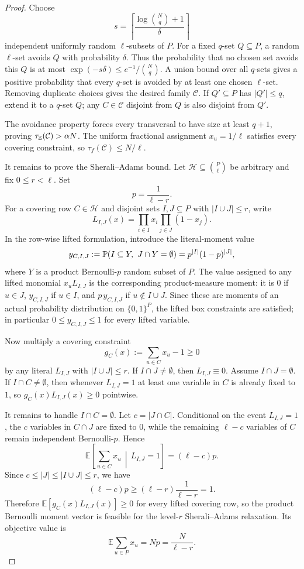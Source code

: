 \begin{proof}
Choose
\[
  s=\left\lceil\frac{\log\binom Nq+1}{\delta}\right\rceil
\]
independent uniformly random $\ell$-subsets of $P$.  For a fixed $q$-set
$Q\subseteq P$, a random $\ell$-set avoids $Q$ with probability $\delta$.
Thus the probability that no chosen set avoids this $Q$ is at most
$\exp(-s\delta)\le e^{-1}/\binom Nq$.  A union bound over all $q$-sets gives a
positive probability that every $q$-set is avoided by at least one chosen
$\ell$-set.  Removing duplicate choices gives the desired family
$\mathcal C$.  If $Q'\subseteq P$ has $|Q'|\le q$, extend it to a $q$-set
$Q$; any $C\in\mathcal C$ disjoint from $Q$ is also disjoint from $Q'$.

The avoidance property forces every transversal to have size at least
$q+1$, proving $\tau_{\mathbb{Z}}(\mathcal C)> \alpha N$.  The uniform fractional
assignment $x_u=1/\ell$ satisfies every covering constraint, so
$\tau_f(\mathcal C)\le N/\ell$.

It remains to prove the Sherali--Adams bound.  Let
$\mathcal H\subseteq\binom P\ell$ be arbitrary and fix $0\le r<\ell$.  Set
\[
  p=\frac1{\ell-r}.
\]
For a covering row $C\in\mathcal H$ and disjoint sets
$I,J\subseteq P$ with $|I\cup J|\le r$, write
\[
  L_{I,J}(x)=\prod_{i\in I}x_i\prod_{j\in J}(1-x_j).
\]
In the row-wise lifted formulation, introduce the literal-moment value
\[
  y_{C,I,J}:=\mathbb{P}(I\subseteq Y,\ J\cap Y=\emptyset)
  =p^{|I|}(1-p)^{|J|},
\]
where $Y$ is a product Bernoulli-$p$ random subset of $P$.  The value assigned
to any lifted monomial $x_uL_{I,J}$ is the corresponding product-measure
moment: it is $0$ if $u\in J$, $y_{C,I,J}$ if $u\in I$, and
$p\,y_{C,I,J}$ if $u\notin I\cup J$.  Since these are moments of an actual
probability distribution on $\{0,1\}^P$, the lifted box constraints are
satisfied; in particular $0\le y_{C,I,J}\le 1$ for every lifted variable.

Now multiply a covering constraint
\[
  g_C(x):=\sum_{u\in C}x_u-1\ge 0
\]
by any literal $L_{I,J}$ with $|I\cup J|\le r$.  If $I\cap J\ne\emptyset$,
then $L_{I,J}\equiv 0$.  Assume $I\cap J=\emptyset$.  If
$I\cap C\ne\emptyset$, then whenever $L_{I,J}=1$ at least one variable in
$C$ is already fixed to $1$, so $g_C(x)L_{I,J}(x)\ge 0$ pointwise.

It remains to handle $I\cap C=\emptyset$.  Let $c=|J\cap C|$.  Conditional on
the event $L_{I,J}=1$, the $c$ variables in $C\cap J$ are fixed to $0$, while
the remaining $\ell-c$ variables of $C$ remain independent Bernoulli-$p$.
Hence
\[
  \mathbb{E}\!\left[\sum_{u\in C}x_u\,\middle|\, L_{I,J}=1\right]
  =(\ell-c)p.
\]
Since $c\le |J|\le |I\cup J|\le r$, we have
\[
  (\ell-c)p\ge (\ell-r)\frac1{\ell-r}=1.
\]
Therefore $\mathbb{E}[g_C(x)L_{I,J}(x)]\ge 0$ for every lifted covering row, so the
product Bernoulli moment vector is feasible for the level-$r$
Sherali--Adams relaxation.  Its objective value is
\[
  \mathbb{E}\sum_{u\in P}x_u=Np=\frac{N}{\ell-r}.
\]
\end{proof}


